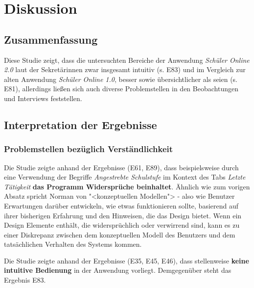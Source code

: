 \section{Diskussion}

\subsection{Zusammenfassung}
Diese Studie zeigt, dass die untersuchten Bereiche der Anwendung \textit{Schüler Online 2.0} laut der Sekretärinnen zwar insgesamt intuitiv (s. E83) und im Vergleich zur alten Anwendung \textit{Schüler Online 1.0}, \glqq besser\grqq{} sowie \glqq übersichtlicher \grqq{} als seien (s. E81), allerdings ließen sich auch diverse Problemstellen in den Beobachtungen und Interviews feststellen. 

%

\subsection{Interpretation der Ergebnisse}

\subsubsection{Problemstellen bezüglich Verständlichkeit}

Die Studie zeigte anhand der Ergebnisse (E61, E89), dass beispielsweise durch eine Verwendung der Begriffe \textit{Angestrebte Schulstufe} im Kontext des Tabs \textit{Letzte Tätigkeit} \textbf{das Programm Widersprüche beinhaltet}. Ähnlich wie zum vorigen Absatz spricht Norman von "<konzeptuellen Modellen"> - also wie Benutzer Erwartungen darüber entwickeln, wie etwas funktionieren sollte, basierend auf ihrer bisherigen Erfahrung und den Hinweisen, die das Design bietet. Wenn ein Design Elemente enthält, die widersprüchlich oder verwirrend sind, kann es zu einer Diskrepanz zwischen dem konzeptuellen Modell des Benutzers und dem tatsächlichen Verhalten des Systems kommen. 

Die Studie zeigte anhand der Ergebnisse (E35, E45, E46), dass stellenweise \textbf{keine intuitive Bedienung} in der Anwendung vorliegt. Demgegenüber steht das Ergebnis E83.

